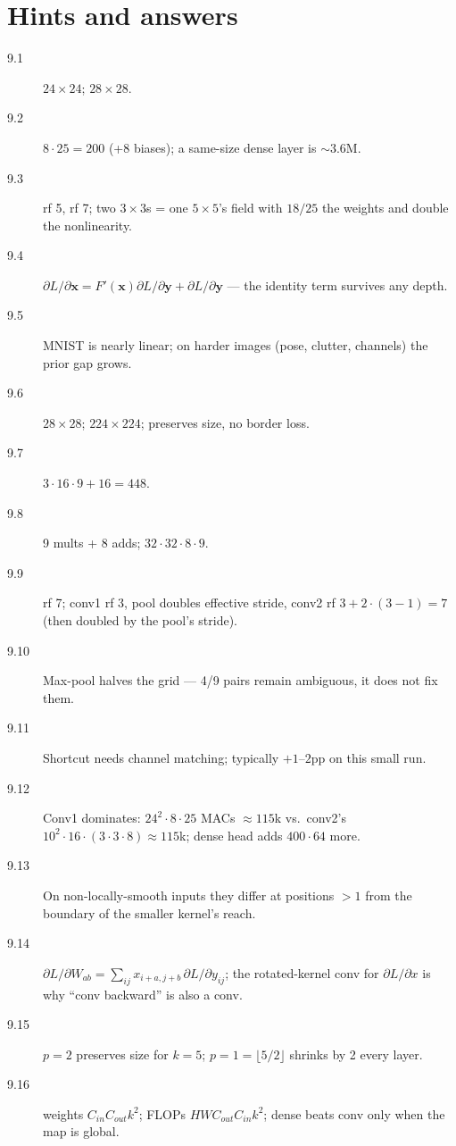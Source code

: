 \section*{Hints and answers}
\begin{description}
\item[9.1] $24\times24$; $28\times28$.
\item[9.2] $8\cdot25=200$ (+8 biases); a same-size dense layer is
$\sim$3.6M.
\item[9.3] rf 5, rf 7; two $3\times3$s = one $5\times5$'s field with
$18/25$ the weights and double the nonlinearity.
\item[9.4] $\partial L/\partial\mathbf x =
F'(\mathbf x)\partial L/\partial\mathbf y + \partial L/\partial\mathbf y$
--- the identity term survives any depth.
\item[9.5] MNIST is nearly linear; on harder images (pose, clutter,
channels) the prior gap grows.
\item[9.6] $28\times28$; $224\times224$; preserves size, no border
loss.
\item[9.7] $3\cdot16\cdot9+16=448$.
\item[9.8] 9 mults + 8 adds; $32\cdot32\cdot8\cdot9$.
\item[9.9] rf 7; conv1 rf 3, pool doubles effective stride, conv2 rf
$3+2\cdot(3-1)=7$ (then doubled by the pool's stride).
\item[9.10] Max-pool halves the grid --- 4/9 pairs remain ambiguous,
it does not fix them.
\item[9.11] Shortcut needs channel matching; typically $+1$--$2$pp
on this small run.
\item[9.12] Conv1 dominates: $24^2\cdot8\cdot25$ MACs
$\approx 115$k vs.\ conv2's $10^2\cdot16\cdot(3\cdot3\cdot8)\approx115$k;
dense head adds $400\cdot64$ more.
\item[9.13] On non-locally-smooth inputs they differ at positions
$>1$ from the boundary of the smaller kernel's reach.
\item[9.14] $\partial L/\partial W_{ab}=\sum_{ij}
x_{i+a,j+b}\,\partial L/\partial y_{ij}$; the rotated-kernel conv for
$\partial L/\partial x$ is why ``conv backward'' is also a conv.
\item[9.15] $p{=}2$ preserves size for $k{=}5$;
$p{=}1=\lfloor 5/2\rfloor$ shrinks by 2 every layer.
\item[9.16] weights $C_{in}C_{out}k^2$; FLOPs
$HWC_{out}C_{in}k^2$; dense beats conv only when the map is global.
\end{description}
